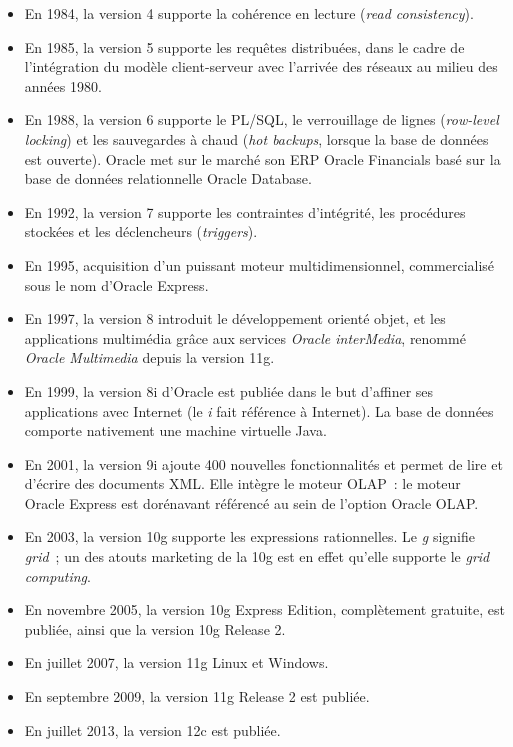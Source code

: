 \documentclass[12pt,a4paper]{report}
\begin{document}
\begin{itemize}[leftmargin=*]
  \item En 1984, la version 4 supporte la cohérence en lecture
        (\emph{read consistency}).
  \item En 1985, la version 5 supporte les requêtes distribuées, dans le cadre
        de l'intégration du modèle client-serveur avec l'arrivée des réseaux au
        milieu des années 1980.
  \item En 1988, la version 6 supporte le PL/SQL, le verrouillage de lignes
        (\emph{row-level locking}) et les sauvegardes à chaud (\emph{hot backups},
        lorsque la base de données est ouverte). Oracle met sur le marché son ERP
        Oracle Financials basé sur la base de données relationnelle Oracle Database.
  \item En 1992, la version 7 supporte les contraintes d'intégrité, les procédures
        stockées et les déclencheurs (\emph{triggers}).
  \item En 1995, acquisition d'un puissant moteur multidimensionnel, commercialisé
        sous le nom d'Oracle Express.
  \item En 1997, la version 8 introduit le développement orienté objet, et les
        applications multimédia grâce aux services \emph{Oracle interMedia},
        renommé \emph{Oracle Multimedia} depuis la version 11g.
  \item En 1999, la version 8i d'Oracle est publiée dans le but d'affiner ses
        applications avec Internet (le \emph{i} fait référence à Internet). La
        base de données comporte nativement une machine virtuelle Java.
  \item En 2001, la version 9i ajoute 400 nouvelles fonctionnalités et permet
        de lire et d'écrire des documents XML. Elle intègre le moteur OLAP~:
        le moteur Oracle Express est dorénavant référencé au sein de l'option
        Oracle OLAP.
  \item En 2003, la version 10g supporte les expressions rationnelles. Le
        \emph{g} signifie \emph{grid}~; un des atouts marketing de la 10g est
        en effet qu'elle supporte le \emph{grid computing}.
  \item En novembre 2005, la version 10g Express Edition, complètement gratuite,
        est publiée, ainsi que la version 10g Release 2.
  \item En juillet 2007, la version 11g Linux et Windows.
  \item En septembre 2009, la version 11g Release 2 est publiée.
  \item En juillet 2013, la version 12c est publiée.
\end{itemize}
\end{document}
